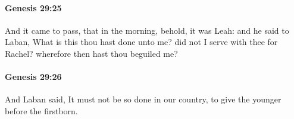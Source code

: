 		\paragraph{Genesis 29:25} %
			\label{GENESIS-29-25}

			And it came to pass, that in the morning, behold, it was Leah: and he said to Laban, What is this thou hast done unto me? did not I serve with thee for Rachel? wherefore then hast thou beguiled me?


		\paragraph{Genesis 29:26} %
			\label{GENESIS-29-26}

			And Laban said, It must not be so done in our country, to give the younger before the firstborn.


